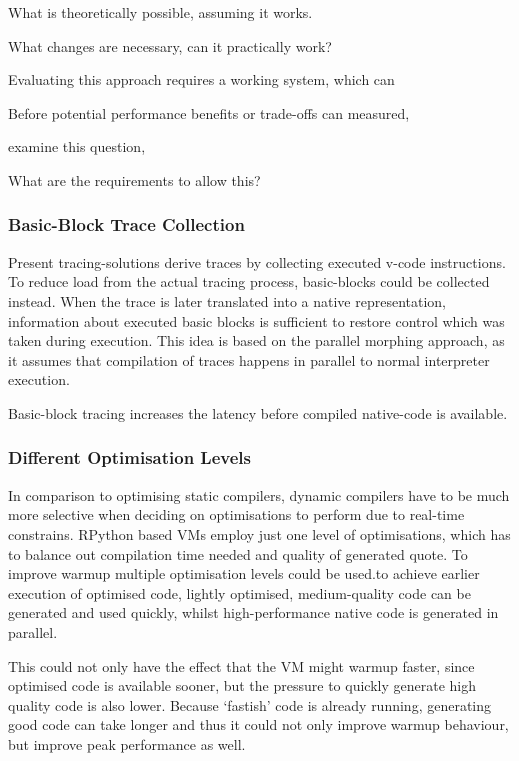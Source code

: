What is theoretically possible, assuming it works.

What changes are necessary, can it practically work?

Evaluating this approach requires a working system, which can 

Before potential performance benefits or trade-offs can measured, 



examine this question, 

What are the requirements to allow this?


\subsubsection{Basic-Block Trace Collection} Present tracing-solutions derive
traces by collecting executed v-code instructions. To reduce load from the
actual tracing process, basic-blocks could be collected instead. When the trace
is later translated into a native representation, information about executed
basic blocks is sufficient to restore control which was taken during execution.
This idea is based on the parallel morphing approach, as it assumes that
compilation of traces happens in parallel to normal interpreter execution.

Basic-block tracing increases the latency before compiled native-code is
available.


\subsubsection{Different Optimisation Levels}

In comparison to optimising static compilers, dynamic compilers have to be much
more selective when deciding on optimisations to perform due to real-time
constrains. RPython based VMs employ just one level of optimisations, which has
to balance out compilation time needed and quality of generated quote. To
improve warmup multiple optimisation levels could be used.to achieve earlier
execution of optimised code, lightly optimised, medium-quality code can be
generated and used quickly, whilst high-performance native code is generated in
parallel.

This could not only have the effect that the VM might warmup faster, since
optimised code is available sooner, but the pressure to quickly generate high
quality code is also lower. Because `fastish' code is already running,
generating good code can take longer and thus it could not only improve warmup
behaviour, but improve peak performance as well.


